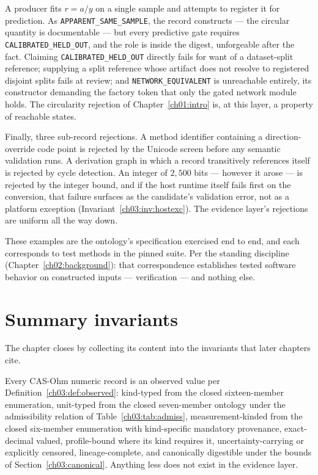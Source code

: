 \begin{example}\label{ch03:ex:rejcircular}
A producer fits $r = a/y$ on a single sample and attempts to register it for prediction. As \texttt{APPARENT\_SAME\_SAMPLE}, the record constructs --- the circular quantity is documentable --- but every predictive gate requires \texttt{CALIBRATED\_HELD\_OUT}, and the role is inside the digest, unforgeable after the fact. Claiming \texttt{CALIBRATED\_HELD\_OUT} directly fails for want of a dataset-split reference; supplying a split reference whose artifact does not resolve to registered disjoint splits fails at review; and \texttt{NETWORK\_EQUIVALENT} is unreachable entirely, its constructor demanding the factory token that only the gated network module holds. The circularity rejection of Chapter~\ref{ch01:intro} is, at this layer, a property of reachable states.
\end{example}

\begin{example}\label{ch03:ex:rejbytes}
Finally, three sub-record rejections. A method identifier containing a direction-override code point is rejected by the Unicode screen before any semantic validation runs. A derivation graph in which a record transitively references itself is rejected by cycle detection. An integer of $2{,}500$ bits --- however it arose --- is rejected by the integer bound, and if the host runtime itself fails first on the conversion, that failure surfaces as the candidate's validation error, not as a platform exception (Invariant~\ref{ch03:inv:hostexc}). The evidence layer's rejections are uniform all the way down.
\end{example}

These examples are the ontology's specification exercised end to end, and each corresponds to test methods in the pinned suite. Per the standing discipline (Chapter~\ref{ch02:background}): that correspondence establishes tested software behavior on constructed inputs --- verification --- and nothing else.

\section{Summary invariants}\label{ch03:invariants}

The chapter closes by collecting its content into the invariants that later chapters cite.

\begin{invariant}\label{ch03:inv:typed}
Every CAS-Ohm numeric record is an observed value per Definition~\ref{ch03:def:observed}: kind-typed from the closed sixteen-member enumeration, unit-typed from the closed seven-member ontology under the admissibility relation of Table~\ref{ch03:tab:admiss}, measurement-kinded from the closed six-member enumeration with kind-specific mandatory provenance, exact-decimal valued, profile-bound where its kind requires it, uncertainty-carrying or explicitly censored, lineage-complete, and canonically digestible under the bounds of Section~\ref{ch03:canonical}. Anything less does not exist in the evidence layer.
\end{invariant}

